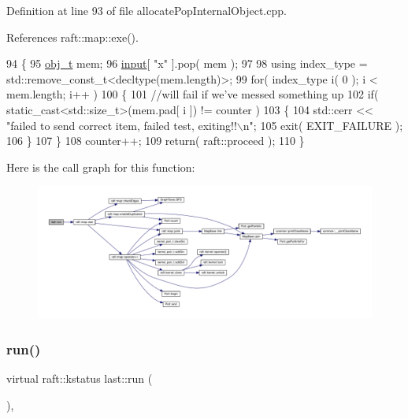Definition at line 93 of file allocate\+Pop\+Internal\+Object.\+cpp.



References raft\+::map\+::exe().


\begin{DoxyCode}
94     \{
95         \hyperlink{structfoo}{obj\_t} mem;
96         \hyperlink{classraft_1_1kernel_a6edbe35a56409d402e719b3ac36d6554}{input}[ \textcolor{stringliteral}{"x"} ].pop( mem );
97 
98         \textcolor{keyword}{using} index\_type = std::remove\_const\_t<decltype(mem.length)>;
99         \textcolor{keywordflow}{for}( index\_type i( 0 ); i < mem.length; i++ )
100         \{
101             \textcolor{comment}{//will fail if we've messed something up}
102             \textcolor{keywordflow}{if}( static\_cast<std::size\_t>(mem.pad[ i ]) != counter )
103             \{
104                 std::cerr << \textcolor{stringliteral}{"failed to send correct item, failed test, exiting!!\(\backslash\)n"};
105                 exit( EXIT\_FAILURE );
106             \}
107         \}
108         counter++;
109         \textcolor{keywordflow}{return}( raft::proceed );
110     \}
\end{DoxyCode}
Here is the call graph for this function\+:
\nopagebreak
\begin{figure}[H]
\begin{center}
\leavevmode
\includegraphics[width=350pt]{classlast_a7a1da1c30f571a8e8ccb515ca2cb2f02_cgraph}
\end{center}
\end{figure}
\hypertarget{classlast_a7a1da1c30f571a8e8ccb515ca2cb2f02}{}\label{classlast_a7a1da1c30f571a8e8ccb515ca2cb2f02} 
\subsubsection{\texorpdfstring{run()}{run()}\hspace{0.1cm}{\footnotesize\ttfamily [3/6]}}
{\footnotesize\ttfamily virtual raft\+::kstatus last\+::run (\begin{DoxyParamCaption}{ }\end{DoxyParamCaption})\hspace{0.3cm}{\ttfamily [inline]}, {\ttfamily [virtual]}}

